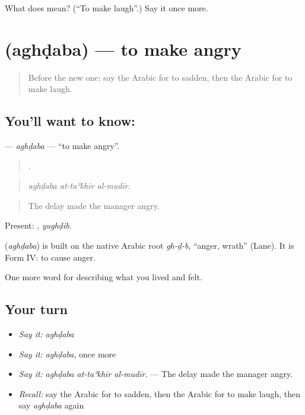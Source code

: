 \begin{tcolorbox}[breakable,colback=teal!4,colframe=teal!35!black,title={Before you move on}]
What does  mean? (\textquotedblleft{}To make laugh\textquotedblright{}.) Say it once more.
\end{tcolorbox}
\section[\texorpdfstring{\ar{أغضب} (aghḍaba)}{أغضب (aghḍaba)}]{ (aghḍaba) — to make angry}

\label{lesson:AR-C498-aghdaba}



\begin{quote}
Before the new one: say the Arabic for to sadden, then the Arabic for to make laugh.
\end{quote}

\subsection*{You'll want to know: }
\textbf{} — \emph{aghḍaba} — \textquotedblleft{}to make angry\textquotedblright{}.

\begin{quote}
  .
\end{quote}

\begin{quote}
\emph{aghḍaba at-taʾkhīr al-mudīr.}
\end{quote}

\begin{quote}
The delay made the manager angry.
\end{quote}

Present: , \emph{yughḍib}.

\begin{cousinweb}
\textbf{} (\emph{aghḍaba}) is built on the native Arabic root \emph{gh-ḍ-b}, \textquotedblleft{}anger, wrath\textquotedblright{} (Lane). It is Form IV: to cause anger.
\end{cousinweb}

\begin{grammarlens}[title={What you've built}]
One more word for describing what you lived and felt.
\end{grammarlens}

\subsection*{Your turn}
\begin{itemize}
\raggedright
  \item \emph{Say it:} \emph{aghḍaba}
  \item \emph{Say it:} \emph{aghḍaba}, once more
  \item \emph{Say it:} \emph{aghḍaba at-taʾkhīr al-mudīr.} — The delay made the manager angry.
  \item \emph{Recall:} say the Arabic for to sadden, then the Arabic for to make laugh, then say \emph{aghḍaba} again
\end{itemize}

